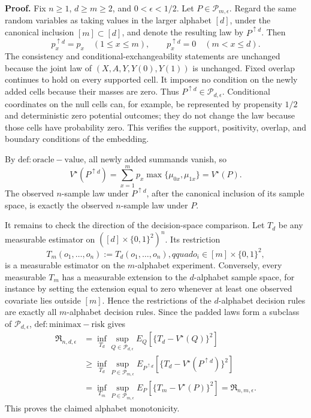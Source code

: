 \textbf{Proof.}
Fix \(n\geq1\), \(d\geq m\geq2\), and \(0<\epsilon<1/2\).  Let \(P\in\mathcal P_{m,\epsilon}\).  Regard the same random variables as taking values in the larger alphabet \([d]\), under the canonical inclusion \([m]\subset[d]\), and denote the resulting law by \(P^{\uparrow d}\).  Then
\[
 p_x^{\uparrow d}=p_x\quad(1\leq x\leq m),
 \qquad
 p_x^{\uparrow d}=0\quad(m<x\leq d).
\]
The consistency and conditional-exchangeability statements are unchanged because the joint law of \((X,A,Y,Y(0),Y(1))\) is unchanged.  Fixed overlap continues to hold on every supported cell.  It imposes no condition on the newly added cells because their masses are zero.  Thus \(P^{\uparrow d}\in\mathcal P_{d,\epsilon}\).  Conditional coordinates on the null cells can, for example, be represented by propensity \(1/2\) and deterministic zero potential outcomes; they do not change the law because those cells have probability zero.  This verifies the support, positivity, overlap, and boundary conditions of the embedding.

By \(\mathrm{def:oracle-value}\), all newly added summands vanish, so
\[
 V^\star(P^{\uparrow d})
 =\sum_{x=1}^m p_x\max\{\mu_{0x},\mu_{1x}\}
 =V^\star(P).
\]
The observed \(n\)-sample law under \(P^{\uparrow d}\), after the canonical inclusion of its sample space, is exactly the observed \(n\)-sample law under \(P\).

It remains to check the direction of the decision-space comparison.  Let \(T_d\) be any measurable estimator on \(([d]\times\{0,1\}^2)^n\).  Its restriction
\[
 T_m(o_1,\ldots,o_n):=T_d(o_1,\ldots,o_n),
 qquad o_i\in[m]\times\{0,1\}^2,
\]
is a measurable estimator on the \(m\)-alphabet experiment.  Conversely, every measurable \(T_m\) has a measurable extension to the \(d\)-alphabet sample space, for instance by setting the extension equal to zero whenever at least one observed covariate lies outside \([m]\).  Hence the restrictions of the \(d\)-alphabet decision rules are exactly all \(m\)-alphabet decision rules.  Since the padded laws form a subclass of \(\mathcal P_{d,\epsilon}\), \(\mathrm{def:minimax-risk}\) gives
\[
\begin{aligned}
 \mathfrak R_{n,d,\epsilon}
 &=\inf_{T_d}\sup_{Q\in\mathcal P_{d,\epsilon}}
   E_Q\!\left[\{T_d-V^\star(Q)\}^2\right]\\
 &\geq\inf_{T_d}\sup_{P\in\mathcal P_{m,\epsilon}}
   E_{P^{\uparrow d}}\!\left[\{T_d-V^\star(P^{\uparrow d})\}^2\right]\\
 &=\inf_{T_m}\sup_{P\in\mathcal P_{m,\epsilon}}
   E_P\!\left[\{T_m-V^\star(P)\}^2\right]
 =\mathfrak R_{n,m,\epsilon}.
\end{aligned}
\]
This proves the claimed alphabet monotonicity.